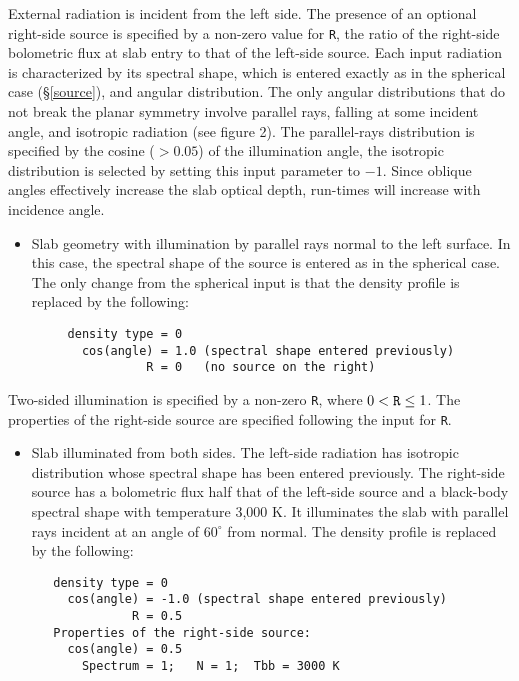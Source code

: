 \documentclass[12pt]{article} \usepackage{epsf}
\begin{document}
External radiation is incident from the left side. The presence of an optional
right-side source is specified by a non-zero value for {\tt R}, the ratio of
the right-side bolometric flux at slab entry to that of the left-side source.
Each input radiation is characterized by its spectral shape, which is entered
exactly as in the spherical case (\S\ref{source}), and angular distribution.
The only angular distributions that do not break the planar symmetry involve
parallel rays, falling at some incident angle, and isotropic radiation (see
figure 2). The parallel-rays distribution is specified by the cosine ($> 0.05$)
of the illumination angle, the isotropic distribution is selected by setting
this input parameter to $-1$.  Since oblique angles effectively increase the
slab optical depth, run-times will increase with incidence angle.
\begin{itemize}
\item
Slab geometry with illumination by parallel rays normal to the left surface. In
this case, the spectral shape of the source is entered as in the spherical
case. The only change from the spherical input is that the density profile is
replaced by the following:
\begin{verbatim}
     density type = 0
       cos(angle) = 1.0 (spectral shape entered previously)
                R = 0   (no source on the right)
\end{verbatim}
\end{itemize}
Two-sided illumination is specified by a non-zero {\tt R}, where $0 < {\tt R}
\le 1$. The properties of the right-side source are specified following the
input for {\tt R}.
\begin{itemize}
\item
Slab illuminated from both sides.  The left-side radiation has isotropic
distribution whose spectral shape has been entered previously.  The right-side
source has a bolometric flux half that of the left-side source and a black-body
spectral shape with temperature 3,000 K.  It illuminates the slab with parallel
rays incident at an angle of $60^\circ$ from normal. The density profile is
replaced by the following:
\begin{verbatim}
   density type = 0
     cos(angle) = -1.0 (spectral shape entered previously)
              R = 0.5
   Properties of the right-side source:
     cos(angle) = 0.5
       Spectrum = 1;   N = 1;  Tbb = 3000 K
\end{verbatim}
\end{itemize}
\end{document}
